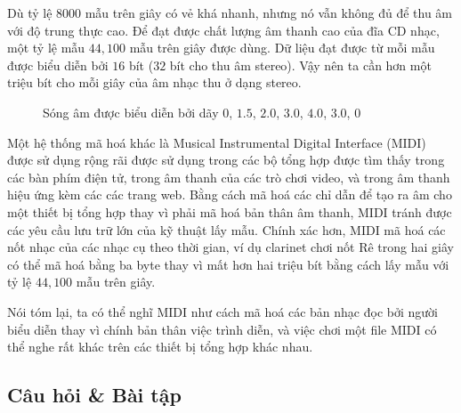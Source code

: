 Dù tỷ lệ $8000$ mẫu trên giây có vẻ khá nhanh, nhưng nó vẫn không đủ để thu âm với độ
trung thực cao. Để đạt được chất lượng âm thanh cao của đĩa CD nhạc, một tỷ lệ mẫu
$44,100$ mẫu trên giây được dùng. Dữ liệu đạt được từ mỗi mẫu được biểu diễn bởi $16$ bít
($32$ bít cho thu âm stereo). Vậy nên ta cần hơn một triệu bít cho mỗi giây của âm nhạc
thu ở dạng stereo.

\begin{figure}[tbh]
\centering
    \caption{Sóng âm được biểu diễn bởi dãy $0$, $1.5$, $2.0$, $3.0$, $4.0$, $3.0$, $0$}
  \label{fig:fig1.14}
\end{figure}


Một hệ thống mã hoá khác là Musical Instrumental Digital Interface (MIDI) được sử dụng
rộng rãi được sử dụng trong các bộ tổng hợp được tìm thấy trong các bàn phím điện tử,
trong âm thanh của các trò chơi video, và trong âm thanh hiệu ứng kèm các các trang
web. Bằng cách mã hoá các chỉ dẫn để tạo ra âm cho một thiết bị tổng hợp thay vì phải mã
hoá bản thân âm thanh, MIDI tránh được các yêu cầu lưu trữ lớn của kỹ thuật lấy mẫu. Chính
xác hơn, MIDI mã hoá các nốt nhạc của các nhạc cụ theo thời gian, ví dụ clarinet chơi nốt
Rê trong hai giây có thể mã hoá bằng ba byte thay vì mất hơn hai triệu bít bằng cách lấy
mẫu với tỷ lệ $44,100$ mẫu trên giây.

Nói tóm lại, ta có thể nghĩ MIDI như cách mã hoá các bản nhạc đọc bởi người biểu diễn thay
vì chính bản thân việc trình diễn, và việc chơi một file MIDI có thể nghe rất khác trên
các thiết bị tổng hợp khác nhau.

\subsection*{Câu hỏi \& Bài tập}

